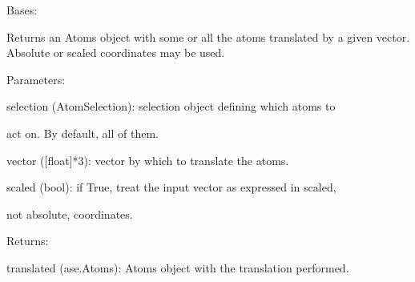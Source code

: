 \documentclass[letterpaper,10pt,english]{sphinxmanual}
\begin{document}

\begin{fulllineitems}
\label{doctree/soprano.properties.transform.transform:soprano.properties.transform.transform.Translate}
Bases: {\hyperref[doctree/soprano.properties.atomsproperty:soprano.properties.atomsproperty.AtomsProperty]{\emph{}}}

Returns an Atoms object with some or all the atoms translated by a given
vector. Absolute or scaled coordinates may be used.

\begin{DUlineblock}{0em}
\item[] Parameters:
\item[]
\begin{DUlineblock}{\DUlineblockindent}
\item[] selection (AtomSelection): selection object defining which atoms to
\item[]
\begin{DUlineblock}{\DUlineblockindent}
\item[] act on. By default, all of them.
\end{DUlineblock}
\item[] vector ({[}float{]}*3): vector by which to translate the atoms.
\item[] scaled (bool): if True, treat the input vector as expressed in scaled,
\item[]
\begin{DUlineblock}{\DUlineblockindent}
\item[] not absolute, coordinates.
\end{DUlineblock}
\end{DUlineblock}
\end{DUlineblock}

\begin{DUlineblock}{0em}
\item[] Returns:
\item[]
\begin{DUlineblock}{\DUlineblockindent}
\item[] translated (ase.Atoms): Atoms object with the translation performed.
\end{DUlineblock}
\end{DUlineblock}


\end{fulllineitems}
\end{document}
